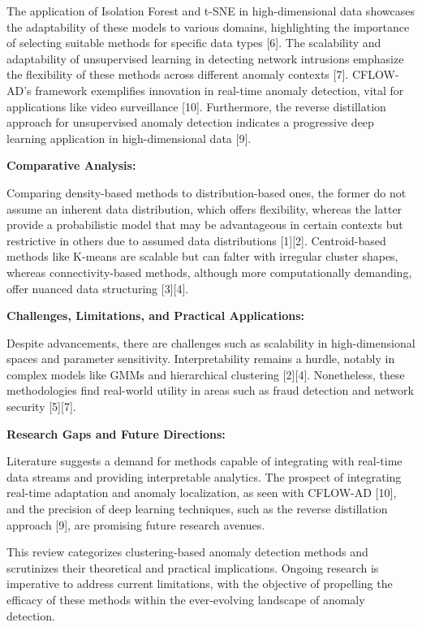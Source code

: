 \documentclass{sigkddExp}
\begin{document}
The application of Isolation Forest and t-SNE in high-dimensional data showcases the adaptability of these models to various domains, highlighting the importance of selecting suitable methods for specific data types [6]. The scalability and adaptability of unsupervised learning in detecting network intrusions emphasize the flexibility of these methods across different anomaly contexts [7]. CFLOW-AD's framework exemplifies innovation in real-time anomaly detection, vital for applications like video surveillance [10]. Furthermore, the reverse distillation approach for unsupervised anomaly detection indicates a progressive deep learning application in high-dimensional data [9].

\textbf{Comparative Analysis:}

Comparing density-based methods to distribution-based ones, the former do not assume an inherent data distribution, which offers flexibility, whereas the latter provide a probabilistic model that may be advantageous in certain contexts but restrictive in others due to assumed data distributions [1][2]. Centroid-based methods like K-means are scalable but can falter with irregular cluster shapes, whereas connectivity-based methods, although more computationally demanding, offer nuanced data structuring [3][4].

\textbf{Challenges, Limitations, and Practical Applications:}

Despite advancements, there are challenges such as scalability in high-dimensional spaces and parameter sensitivity. Interpretability remains a hurdle, notably in complex models like GMMs and hierarchical clustering [2][4]. Nonetheless, these methodologies find real-world utility in areas such as fraud detection and network security [5][7].

\textbf{Research Gaps and Future Directions:}

Literature suggests a demand for methods capable of integrating with real-time data streams and providing interpretable analytics. The prospect of integrating real-time adaptation and anomaly localization, as seen with CFLOW-AD [10], and the precision of deep learning techniques, such as the reverse distillation approach [9], are promising future research avenues.


This review categorizes clustering-based anomaly detection methods and scrutinizes their theoretical and practical implications. Ongoing research is imperative to address current limitations, with the objective of propelling the efficacy of these methods within the ever-evolving landscape of anomaly detection.
\end{document}
